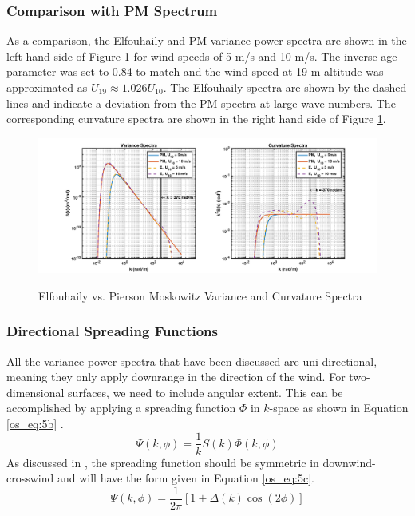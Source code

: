 \subsubsection{Comparison with PM Spectrum}
As a comparison, the Elfouhaily and PM variance power spectra are shown in the left hand side of Figure \ref{os_fig:2} for wind speeds of 5 m/s and 10 m/s. The inverse age parameter was set to 0.84 to match and the wind speed at 19 m altitude was approximated as $U_{19} \approx 1.026 U_{10}$. The Elfouhaily spectra are shown by the dashed lines and indicate a deviation from the PM spectra at large wave numbers. The corresponding curvature spectra are shown in the right hand side of Figure \ref{os_fig:2}. 
\begin{figure}[H]
  \begin{center}
\includegraphics[width=6in]{../media/Ocean_Surface/elf_vs_PM_variance_curvature_spectrum.png}
  \end{center}
  \renewcommand{\baselinestretch}{1} \small\normalsize
  \begin{quote}
    \caption[Elfouhaily vs. Pierson Moskowitz Variance and Curvature Spectra]{Elfouhaily vs. Pierson Moskowitz Variance and Curvature Spectra\label{os_fig:2}}
  \end{quote}
\end{figure}
\renewcommand{\baselinestretch}{2} \small\normalsize

\subsubsection{Directional Spreading Functions}
All the variance power spectra that have been discussed are uni-directional, meaning they only apply downrange in the direction of the wind. For two-dimensional surfaces, we need to include angular extent. This can be accomplished by applying a spreading function $\Phi$ in $k$-space as shown in Equation \ref{os_eq:5b} \cite{elfouhaily}.
\begin{equation}
\label{os_eq:5b}
\Psi(k,\phi) = \frac{1}{k}S(k)\Phi(k,\phi)
\end{equation}
\renewcommand{\baselinestretch}{2} \small\normalsize
As discussed in \cite{elfouhaily}, the spreading function should be symmetric in downwind-crosswind and will have the form given in Equation \ref{os_eq:5c}.
\begin{equation}
\label{os_eq:5c}
\Psi(k,\phi) = \frac{1}{2\pi}\left[1 + \Delta(k)\cos(2\phi) \right]
\end{equation}
\renewcommand{\baselinestretch}{2} \small\normalsize

